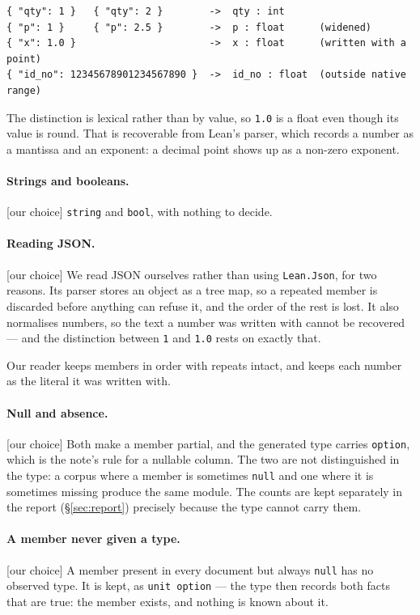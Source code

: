 \documentclass[11pt,a4paper]{article}
\newcommand{\ourcall}{\textcolor{ours}{\textsf{[our choice]}}}
\begin{document}
\begin{lstlisting}[style=json]
{ "qty": 1 }   { "qty": 2 }        ->  qty : int
{ "p": 1 }     { "p": 2.5 }        ->  p : float      (widened)
{ "x": 1.0 }                       ->  x : float      (written with a point)
{ "id_no": 12345678901234567890 }  ->  id_no : float  (outside native range)
\end{lstlisting}

The distinction is lexical rather than by value, so \texttt{1.0} is a float
even though its value is round. That is recoverable from Lean's parser, which
records a number as a mantissa and an exponent: a decimal point shows up as a
non-zero exponent.

\paragraph{Strings and booleans.} \ourcall{} \texttt{string} and
\texttt{bool}, with nothing to decide.

\paragraph{Reading JSON.} \ourcall{} We read JSON ourselves rather than
using \texttt{Lean.Json}, for two reasons. Its parser stores an object as a
tree map, so a repeated member is discarded before anything can refuse it, and
the order of the rest is lost. It also normalises numbers, so the text a
number was written with cannot be recovered --- and the distinction between
\texttt{1} and \texttt{1.0} rests on exactly that.

Our reader keeps members in order with repeats intact, and keeps each number
as the literal it was written with.

\paragraph{Null and absence.} \ourcall{} Both make a member partial, and the
generated type carries \texttt{option}, which is the note's rule for a
nullable column. The two are not distinguished in the type: a corpus where a
member is sometimes \texttt{null} and one where it is sometimes missing
produce the same module. The counts are kept separately in the report
(\S\ref{sec:report}) precisely because the type cannot carry them.

\paragraph{A member never given a type.} \ourcall{} A member present in every
document but always \texttt{null} has no observed type. It is kept, as
\texttt{unit option} --- the type then records both facts that are true: the
member exists, and nothing is known about it.
\end{document}
